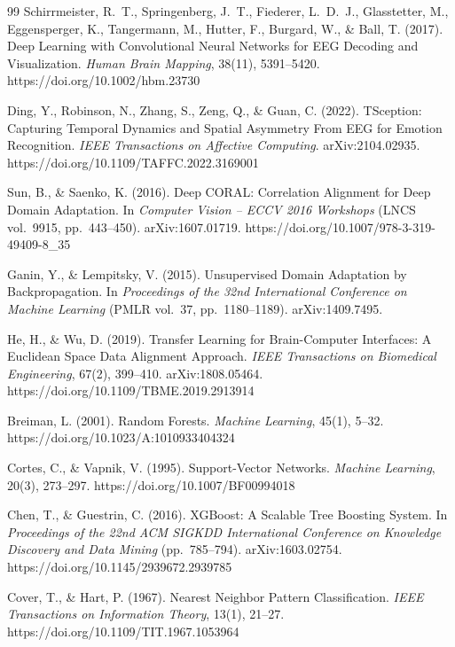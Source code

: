 \documentclass[11pt]{report}
\begin{document}
\begin{thebibliography}{99}
Schirrmeister, R.~T., Springenberg, J.~T., Fiederer, L.~D.~J., Glasstetter,
M., Eggensperger, K., Tangermann, M., Hutter, F., Burgard, W., \& Ball, T.
(2017). Deep Learning with Convolutional Neural Networks for EEG Decoding
and Visualization. \emph{Human Brain Mapping}, 38(11), 5391--5420.
https://doi.org/10.1002/hbm.23730

Ding, Y., Robinson, N., Zhang, S., Zeng, Q., \& Guan, C. (2022). TSception:
Capturing Temporal Dynamics and Spatial Asymmetry From EEG for Emotion
Recognition. \emph{IEEE Transactions on Affective Computing}. arXiv:2104.02935.
https://doi.org/10.1109/TAFFC.2022.3169001

Sun, B., \& Saenko, K. (2016). Deep CORAL: Correlation Alignment for Deep
Domain Adaptation. In \emph{Computer Vision -- ECCV 2016 Workshops}
(LNCS vol.\ 9915, pp.\ 443--450). arXiv:1607.01719.
https://doi.org/10.1007/978-3-319-49409-8\_35

Ganin, Y., \& Lempitsky, V. (2015). Unsupervised Domain Adaptation by
Backpropagation. In \emph{Proceedings of the 32nd International Conference
on Machine Learning} (PMLR vol.\ 37, pp.\ 1180--1189). arXiv:1409.7495.

He, H., \& Wu, D. (2019). Transfer Learning for Brain-Computer Interfaces:
A Euclidean Space Data Alignment Approach. \emph{IEEE Transactions on
Biomedical Engineering}, 67(2), 399--410. arXiv:1808.05464.
https://doi.org/10.1109/TBME.2019.2913914

Breiman, L. (2001). Random Forests. \emph{Machine Learning}, 45(1), 5--32.
https://doi.org/10.1023/A:1010933404324

Cortes, C., \& Vapnik, V. (1995). Support-Vector Networks. \emph{Machine
Learning}, 20(3), 273--297. https://doi.org/10.1007/BF00994018

Chen, T., \& Guestrin, C. (2016). XGBoost: A Scalable Tree Boosting System.
In \emph{Proceedings of the 22nd ACM SIGKDD International Conference on
Knowledge Discovery and Data Mining} (pp.\ 785--794). arXiv:1603.02754.
https://doi.org/10.1145/2939672.2939785

Cover, T., \& Hart, P. (1967). Nearest Neighbor Pattern Classification.
\emph{IEEE Transactions on Information Theory}, 13(1), 21--27.
https://doi.org/10.1109/TIT.1967.1053964


\end{thebibliography}
\end{document}

